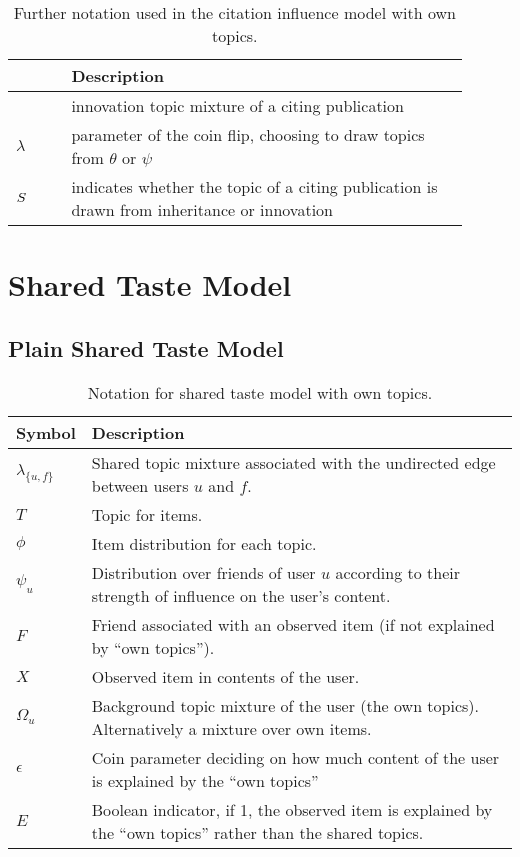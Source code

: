 \documentclass[a4paper]{article}
\begin{document}
%
\begin{table}[tb]
\caption{Further notation used in the citation influence model with own topics.}


\label{tab:Variable-description-owntopics}

{\small }\begin{tabular}{|>{\centering}p{0.11\linewidth}|>{\raggedright}p{0.79\linewidth}|}
\hline 
{\small Symbol} & {\small Description}\tabularnewline
\hline
\hline 
{\small $\psi$} & {\small innovation topic mixture of a citing publication}\tabularnewline
\hline 
{\small $\lambda$} & {\small parameter of the coin flip, choosing to draw topics from $\theta$
or $\psi$}\tabularnewline
\hline 
{\small $\up s$} & {\small indicates whether the topic of a citing publication is drawn
from inheritance or innovation}\tabularnewline
\hline
\end{tabular}
\end{table}



\section{Shared Taste Model}


\subsection{Plain Shared Taste Model}

%
\begin{table}[H]
\noindent \begin{centering}
\begin{tabular}{|>{\centering}p{}|>{\raggedright}p{}|}
\hline 
Symbol & Description\tabularnewline
\hline
\hline 
$\lambda_{\{u,f\}}$ & Shared topic mixture associated with the undirected edge between users
$u$ and $f$.\tabularnewline
\hline 
$T$ & Topic for items.\tabularnewline
\hline 
$\phi$ & Item distribution for each topic.\tabularnewline
\hline 
$\psi_{u}$
 & Distribution over friends of user $u$ according to their strength
of influence on the user's content.\tabularnewline
\hline 
$F$ & Friend associated with an observed item (if not explained by {}``own
topics'').\tabularnewline
\hline 
$X$ & Observed item in contents of the user.\tabularnewline
\hline 
$\Omega_{u}$ & Background topic mixture of the user (the own topics). Alternatively
a mixture over own items.\tabularnewline
\hline 
$\epsilon$ & Coin parameter deciding on how much content of the user is explained
by the {}``own topics''\tabularnewline
\hline 
$E$ & Boolean indicator, if 1, the observed item is explained by the {}``own
topics'' rather than the shared topics.\tabularnewline
\hline
\end{tabular}
\par\end{centering}

\caption{Notation for shared taste model with own topics.\label{tab:Notation-shared-taste}}

\end{table}
\end{document}
